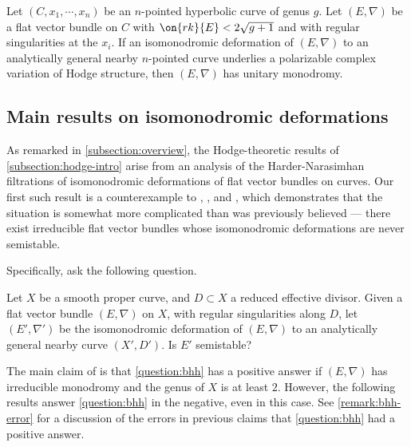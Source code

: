 \begin{theorem}
\notready\label{theorem:isomonodromic-deformation-CVHS}
Let $(C, x_1, \cdots, x_n)$ be an $n$-pointed hyperbolic curve of genus $g$.
Let $({E}, \nabla)$ be a flat vector bundle on
$C$ with $\on{rk}{E}<2\sqrt{g+1}$ and with regular singularities at the $x_i$. If an isomonodromic
deformation of ${(E, \nabla)}$ to an analytically general nearby $n$-pointed curve underlies a polarizable complex variation of Hodge structure, then $({E},\nabla)$ has unitary monodromy.
\end{theorem}

\subsection{Main results on isomonodromic deformations}
\label{subsection:isomonodromy-intro}
As remarked in \autoref{subsection:overview}, the Hodge-theoretic results of
\autoref{subsection:hodge-intro} arise from an analysis of the Harder-Narasimhan filtrations of isomonodromic deformations of flat vector bundles on curves. Our first such result is a counterexample to
\cite[Theorem 1.3]{BHH:logarithmic},
\cite[Theorem 1.3]{BHH:irregular}, and
\cite[Theorem 1.2]{BHH:parabolic}, which demonstrates that the situation is somewhat more complicated than was previously believed --- there exist irreducible flat vector bundles whose isomonodromic deformations are never semistable.

Specifically, \cite{BHH:logarithmic} ask the following
question.
\begin{question}
\notready
	\label{question:bhh}
	Let $X$ be a smooth proper curve, and $D\subset X$ a reduced effective divisor. Given a flat vector bundle $(E, \nabla)$ on $X$, with regular singularities along $D$, let $(E', \nabla')$ be the isomonodromic deformation of $(E,\nabla)$ to an analytically general nearby curve $(X', D')$. Is $E'$ semistable?
\end{question}

The main claim of \cite{BHH:logarithmic} is that \autoref{question:bhh} has a positive answer if $(E,\nabla)$ has irreducible monodromy and the genus of $X$ is at least $2$. However, the following results answer \autoref{question:bhh} in the negative, even in this case. See \autoref{remark:bhh-error} for a discussion of the errors in previous claims that \autoref{question:bhh} had a positive answer.

